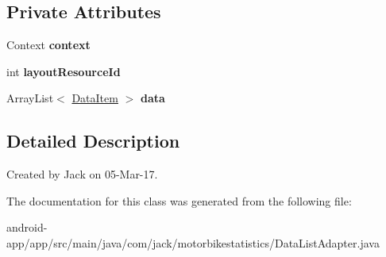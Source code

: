 \subsection*{Private Attributes}
\begin{DoxyCompactItemize}
\item 
\mbox{\label{classcom_1_1jack_1_1motorbikestatistics_1_1_data_list_adapter_a2d3041a39701b01f4075cdc8c0bf4463}} 
Context {\bfseries context}
\item 
\mbox{\label{classcom_1_1jack_1_1motorbikestatistics_1_1_data_list_adapter_a03f68396c0f1b8b03feed8d6e3cf115d}} 
int {\bfseries layout\+Resource\+Id}
\item 
\mbox{\label{classcom_1_1jack_1_1motorbikestatistics_1_1_data_list_adapter_a1e45ca05e79075976732ea14de9fbc5d}} 
Array\+List$<$ \hyperlink{classcom_1_1jack_1_1motorbikestatistics_1_1_data_item}{Data\+Item} $>$ {\bfseries data}
\end{DoxyCompactItemize}


\subsection{Detailed Description}
Created by Jack on 05-\/\+Mar-\/17. 

The documentation for this class was generated from the following file\+:\begin{DoxyCompactItemize}
\item 
android-\/app/app/src/main/java/com/jack/motorbikestatistics/Data\+List\+Adapter.\+java\end{DoxyCompactItemize}
